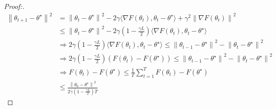 \begin{proof}[Proof:]
    \begin{align*}
        \left\| \theta _{t+1} - \theta ^\star  \right\| ^2 
            &= \left\| \theta _t - \theta ^\star  \right\| ^2 - 2 \gamma  \langle \nabla F(\theta _t), \theta _t - \theta ^\star \rangle + \gamma  ^2 \left\| \nabla F(\theta _t) \right\| ^2 \\
            &\leq  \left\| \theta _t - \theta ^\star  \right\| ^2 - 2 \gamma ( 1 - \frac{\gamma L }{2}) \langle \nabla F(\theta _t) , \theta _t - \theta ^\star \rangle  \\
            &\Rightarrow 2 \gamma (1 - \frac{\gamma L}{2}) \langle \nabla F(\theta _t) , \theta _t - \theta ^\star \rangle \leq  \left\| \theta _{t-1} - \theta ^\star  \right\| ^2 - \left\| \theta _t - \theta ^\star  \right\| ^2  \\
            &\Rightarrow 2 \gamma (1 - \frac{\gamma L }{2}) (F(\theta _t) - F(\theta ^\star )) \leq  \left\| \theta _{t-1} - \theta ^\star  \right\| ^2 - \left\| \theta _t - \theta ^\star  \right\| ^2  \\
            &\Rightarrow F(\theta _t) - F(\theta ^\star )
            \leq \frac{1}{T}\sum_{t=1}^{T} F(\theta _t) - F(\theta ^\star ) \\
            &\leq \frac{\left\| \theta _0 - \theta ^\star  \right\| ^2}{ 2 \gamma (1 - \frac{\gamma L}{2}) T}
    \end{align*}
    
\end{proof}
